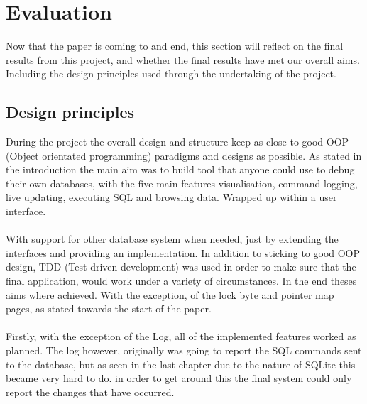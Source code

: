 %
%
%
%
%
%

\section{Evaluation}
\label{sec:evaluation}

Now that the paper is coming to and end, this section will reflect on the final results from this project, and whether the final results have met our overall aims. Including the design principles used through the undertaking of the project.

\subsection{Design principles}
\label{subsec:design_principles}

During the project the overall design and structure keep as close to good OOP (Object orientated programming) paradigms and designs as possible. As stated in the introduction the main aim was to build tool that anyone could use to debug their own databases, with the five main features visualisation, command logging, live updating, executing SQL and browsing data. Wrapped up within a user interface. 
\\\\
With support for other database system when needed, just by extending the interfaces and providing an implementation. In addition to sticking to good OOP design, TDD (Test driven development) was used in order to make sure that the final application, would work under a variety of circumstances. In the end theses aims where achieved. With the exception, of the lock byte and pointer map pages, as stated towards the start of the paper. 
\\\\
Firstly, with the exception of the Log, all of the implemented features worked as planned. The log however, originally was going to report the SQL commands sent to the database, but as seen in the last chapter due to the nature of SQLite this became very hard to do. in order to get around this the final system could only report the changes that have occurred.

